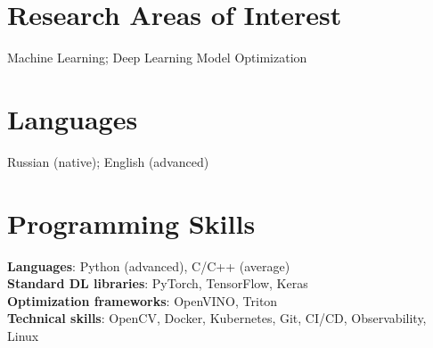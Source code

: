 \section{\sc Research Areas of Interest}
{Machine Learning; Deep Learning Model Optimization}

\vspace{3pt}

\section{\sc Languages}
{Russian (native); English (advanced)}

\section{\sc Programming Skills}
\textbf{Languages}: Python (advanced), C/C++ (average) \\
\textbf{Standard DL libraries}: PyTorch, TensorFlow, Keras \\
\textbf{Optimization frameworks}: OpenVINO, Triton \\
\textbf{Technical skills}: OpenCV, Docker, Kubernetes, Git, CI/CD, Observability, Linux

\endinput
